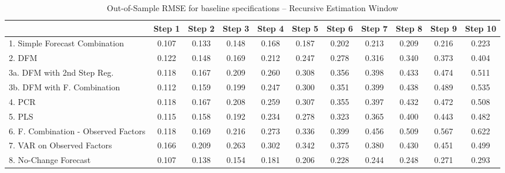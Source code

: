 \documentclass[11pt]{article}
\begin{document}
\clearpage
\begin{table}
\center
\caption{Out-of-Sample RMSE for baseline specifications -- Recursive Estimation Window} \label{table_rmse_baseline}
\begin{tabular}{|l|c|c|c|c|c|c|c|c|c|c|}
\hline
&Step 1 &Step 2 &Step 3 &Step 4 &Step 5 &Step 6 &Step 7 &Step 8 &Step 9 &Step 10\\
\hline
1. Simple Forecast Combination             &0.107&0.133&0.148&0.168&0.187&0.202&0.213&0.209&0.216&0.223\\
2. DFM                                                       &0.122&0.148&0.169&0.212&0.247&0.278&0.316&0.340&0.373&0.404\\
3a. DFM with 2nd Step Reg.           &0.118&0.167&0.209&0.260&0.308&0.356&0.398&0.433&0.474&0.511\\
3b. DFM with F. Combination          &0.112&0.159&0.199&0.247&0.300&0.351&0.399&0.438&0.489&0.535\\
4. PCR                               &0.118&0.167&0.208&0.259&0.307&0.355&0.397&0.432&0.472&0.508\\
5. PLS                               &0.115&0.158&0.192&0.234&0.278&0.323&0.365&0.400&0.443&0.482\\
6. F. Combination - Observed Factors &0.118&0.169&0.216&0.273&0.336&0.399&0.456&0.509&0.567&0.622\\
7. VAR on Observed Factors           &0.166&0.209&0.263&0.302&0.342&0.375&0.380&0.430&0.451&0.499\\
8. No-Change Forecast                &0.107&0.138&0.154&0.181&0.206&0.228&0.244&0.248&0.271&0.293\\
\hline
\end{tabular}
\end{table}
\end{document}
